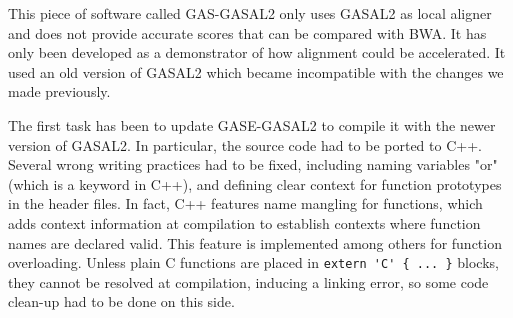This piece of software called GAS-GASAL2 only uses GASAL2 as local aligner and does not provide accurate scores that can be compared with BWA. It has only been developed as a demonstrator of how alignment could be accelerated. It used an old version of GASAL2 which became incompatible with the changes we made previously.

The first task has been to update GASE-GASAL2 to compile it with the newer version of GASAL2. In particular, the source code had to be ported to C++. Several wrong writing practices had to be fixed, including naming variables "or" (which is a keyword in C++), and defining clear context for function prototypes in the header files. In fact, C++ features name mangling for functions, which adds context information at compilation to establish contexts where function names are declared valid. This feature is implemented among others for function overloading. Unless plain C functions are placed in \verb|extern 'C' { ... }| blocks, they cannot be resolved at compilation, inducing a linking error, so some code clean-up had to be done on this side.